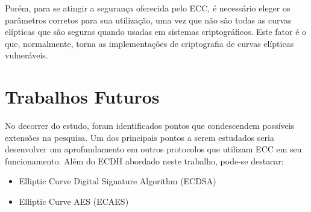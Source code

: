 \documentclass[12pt]{article}
\begin{document}
        Porém, para se atingir a segurança oferecida pelo ECC, é necessário eleger os parâmetros corretos para sua utilização, uma vez que não são todas as curvas elípticas que são seguras quando usadas em sistemas criptográficos. Este fator é o que, normalmente, torna as implementações de criptografia de curvas elípticas vulneráveis.
        
        \clearpage
        \newpage

    \section{Trabalhos Futuros}
    \label{sec:trabalhos_futuros}

        No decorrer do estudo, foram identificados pontos que condescendem possíveis extensões na pesquisa. Um dos principais pontos a serem estudados seria desenvolver um aprofundamento em outros protocolos que utilizam ECC em seu funcionamento. Além do ECDH abordado neste trabalho, pode-se destacar:

        \begin{itemize}
            \item Elliptic Curve Digital Signature Algorithm (ECDSA)
            \item Elliptic Curve AES (ECAES)
        \end{itemize}

    
    

\flushend 
\end{document}
